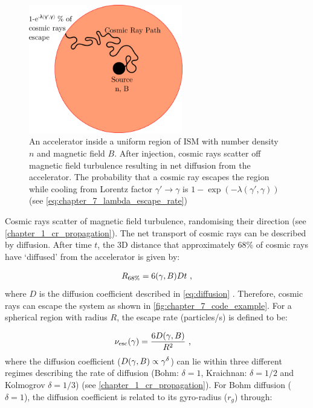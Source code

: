 \begin{figure}
    \centering
    \includegraphics[width=0.6\textwidth]{07_Particle_Evolution/Images/Code/code_example.png}
    \caption{An accelerator inside a uniform region of ISM with number density $n$ and magnetic field $B$. After injection, cosmic rays scatter off magnetic field turbulence resulting in net diffusion from the accelerator. The probability that a cosmic ray escapes the region while cooling from Lorentz factor $\gamma'\rightarrow\gamma$ is $1-\exp(-\lambda(\gamma',\gamma))$ (see \autoref{eq:chapter_7_lambda_escape_rate})}
    \label{fig:chapter_7_code_example}
\end{figure}

Cosmic rays scatter of magnetic field turbulence, randomising their direction (see \autoref{chapter_1_cr_propagation}). The net transport of cosmic rays can be described by diffusion. After time $t$, the 3D distance that approximately $68\%$ of cosmic rays have `diffused' from the accelerator is given by:

\begin{equation}
    \begin{aligned}
        R_{68\%}=6\qty(\gamma,B)Dt\text{ ,}
    \end{aligned} \label{eq:chapter_7_6Dt}
\end{equation}
\noindent where $D$ is the diffusion coefficient described in \autoref{eq:diffusion} \citep{1996A&A...309..917A}. Therefore, cosmic rays can escape the system as shown in \autoref{fig:chapter_7_code_example}. For a spherical region with radius $R$, the escape rate (particles/s) is defined to be:

\begin{equation}
    \begin{aligned}
    \nu_\text{esc}\qty(\gamma)&=\frac{6D\qty(\gamma,B)}{R^2}\text{ ,}
    \end{aligned} \label{eq:chapter_7_escape_rate}
\end{equation}
\noindent where the diffusion coefficient ($D\qty(\gamma,B)\propto \gamma^\delta $) can lie within three different regimes describing the rate of diffusion (Bohm: $\delta=1$, Kraichnan: $\delta=1/2$ and Kolmogrov $\delta =1/3$) (see \autoref{chapter_1_cr_propagation}). \noindent For Bohm diffusion ($\delta=1$), the diffusion coefficient is related to its gyro-radius ($r_g$) through:

